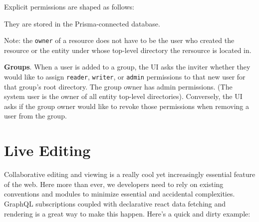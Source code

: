 Explicit permissions are shaped as follows:

\begin{Shaded}
\begin{Highlighting}[]
\OperatorTok{\{}
\OperatorTok{:} \OperatorTok{!}
\OperatorTok{:}\OperatorTok{!}
\OperatorTok{:}\OperatorTok{!}
\OperatorTok{\}}
\end{Highlighting}
\end{Shaded}

They are stored in the Prisma-connected database.

Note: the \texttt{owner} of a resource does not have to be the user who
created the resource or the entity under whose top-level directory the
rersource is located in.

\textbf{Groups}. When a user is added to a group, the UI asks the
inviter whether they would like to assign \texttt{reader},
\texttt{writer}, or \texttt{admin} permissions to that new user for that
group's root directory. The group owner has admin permissions. (The
system user is the owner of all entity top-level directories).
Conversely, the UI asks if the group owner would like to revoke those
permissions when removing a user from the group.

\hypertarget{live-editing}{%
\section{Live Editing}\label{live-editing}}

Collaborative editing and viewing is a really cool yet increasingly
essential feature of the web. Here more than ever, we developers need to
rely on existing conventions and modules to minimize essential and
accidental complexities. GraphQL subscriptions coupled with declarative
react data fetching and rendering is a great way to make this happen.
Here's a quick and dirty example:

